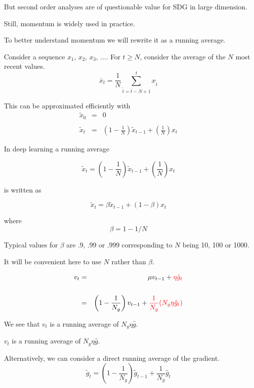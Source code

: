 {\vfill
But second order analyses are of questionable value for SDG in large dimension.

\vfill
Still, momentum is widely used in practice.

\vfill
To better understand momentum we will rewrite it as a running average.

Consider a sequence $x_1$, $x_2$, $x_3$, $\ldots$.
\vfill
For $t \geq N$, consider the average of the $N$ most recent values.
$$\overline{x}_t = \frac{1}{N} \sum_{\tilde{t} = t-N+1}^t x_{\tilde{t}}$$

\vfill
This can be approximated efficiently with
\begin{eqnarray*}
\tilde{x}_0 & = & 0 \\
\\
\tilde{x}_t & = & \left(1-\frac{1}{N}\right)\tilde{x}_{t-1} + \left(\frac{1}{N}\right)x_t
\end{eqnarray*}


In deep learning a running average

$$\tilde{x}_t = \left(1-\frac{1}{N}\right)\tilde{x}_{t-1} + \left(\frac{1}{N}\right)x_t$$

\vfill
is written as

$$\tilde{x}_t = \beta\tilde{x}_{t-1} + (1-\beta)x_t$$

\vfill
where
$$\beta = 1 - 1/N$$

\vfill
Typical values for $\beta$ are .9, .99 or .999 corresponding to $N$ being 10, 100 or 1000.

\vfill
It will be convenient here to use $N$ rather than $\beta$.


\begin{eqnarray*}
v_t & = & \mu v_{t-1} + {\color{red} \eta \hat{g}_t} \\
\\
& = & \left(1-\frac{1}{N_g}\right) v_{t-1} + {\color{red} \frac{1}{N_g}(N_g\eta \hat{g}_t)}
\end{eqnarray*}

\vfill
We see that $v_t$ is a running average of $N_g \eta \hat{g}$.


$v_t$ is a running average of $N_g \eta \hat{g}$.

\vfill
Alternatively, we can consider a direct running average of the gradient.
$$\tilde{g}_t = \left(1-\frac{1}{N_g}\right)\tilde{g}_{t-1} + \frac{1}{N_g} \hat{g}_t$$

}
